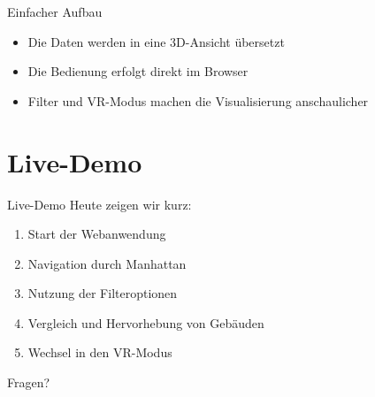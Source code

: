 \documentclass[
amberg, %
toc=fancy, %
footlinebox, %
nometaot %
]{OTHAWbeamer}
\begin{document}
    \begin{frame}{Einfacher Aufbau}
        \begin{center}
        \end{center}

        \vspace{0.6cm}

        \begin{itemize}
            \item Die Daten werden in eine 3D-Ansicht übersetzt
            \item Die Bedienung erfolgt direkt im Browser
            \item Filter und VR-Modus machen die Visualisierung anschaulicher
        \end{itemize}
    \end{frame}

    \section{Live-Demo}

    \begin{frame}{Live-Demo}
        Heute zeigen wir kurz:

        \vspace{0.25cm}

        \begin{enumerate}
            \item Start der Webanwendung
            \item Navigation durch Manhattan
            \item Nutzung der Filteroptionen
            \item Vergleich und Hervorhebung von Gebäuden
            \item Wechsel in den VR-Modus
        \end{enumerate}

        \vspace{0.7cm}

        \begin{center}
            \Huge Fragen?
        \end{center}
    \end{frame}
\end{document}

